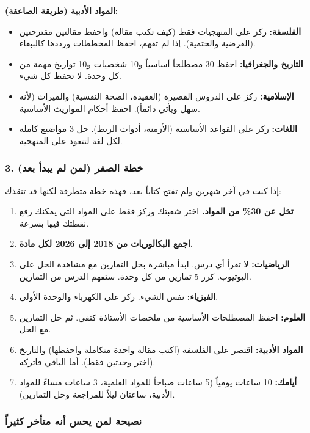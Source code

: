 \documentclass[12pt,a4paper]{book}
\begin{document}
	\textbf{المواد الأدبية (طريقة الصاعقة):}
	\begin{itemize}
		\item \textbf{الفلسفة:} ركز على المنهجيات فقط (كيف تكتب مقالة) واحفظ مقالتين مقترحتين (الفرضية والحتمية). إذا لم تفهم، احفظ المخططات ورددها كالببغاء.
		\item \textbf{التاريخ والجغرافيا:} احفظ 30 مصطلحاً أساسياً و10 شخصيات و10 تواريخ مهمة من كل وحدة. لا تحفظ كل شيء.
		\item \textbf{الإسلامية:} ركز على الدروس القصيرة (العقيدة، الصحة النفسية) والميراث (لأنه سهل ويأتي دائماً). احفظ أحكام المواريث الأساسية.
		\item \textbf{اللغات:} ركز على القواعد الأساسية (الأزمنة، أدوات الربط). حل 3 مواضيع كاملة لكل لغة لتتعود على المنهجية.
	\end{itemize}
	
	\subsubsection*{3. خطة الصفر (لمن لم يبدأ بعد)}
	إذا كنت في آخر شهرين ولم تفتح كتاباً بعد، فهذه خطة متطرفة لكنها قد تنقذك:
	
	\begin{enumerate}
		\item \textbf{تخل عن 30\% من المواد.} اختر شعبتك وركز فقط على المواد التي يمكنك رفع نقطتك فيها بسرعة.
		\item \textbf{اجمع البكالوريات من 2018 إلى 2026 لكل مادة.}
		\item \textbf{الرياضيات:} لا تقرأ أي درس. ابدأ مباشرة بحل التمارين مع مشاهدة الحل على اليوتيوب. كرر 5 تمارين من كل وحدة. ستفهم الدرس من التمارين.
		\item \textbf{الفيزياء:} نفس الشيء. ركز على الكهرباء والوحدة الأولى.
		\item \textbf{العلوم:} احفظ المصطلحات الأساسية من ملخصات الأستاذة كتفي. ثم حل التمارين مع الحل.
		\item \textbf{المواد الأدبية:} اقتصر على الفلسفة (اكتب مقالة واحدة متكاملة واحفظها) والتاريخ (اختر وحدتين فقط). أما الباقي فاتركه.
		\item \textbf{أيامك:} 10 ساعات يومياً (5 ساعات صباحاً للمواد العلمية، 3 ساعات مساءً للمواد الأدبية، ساعتان ليلاً للمراجعة وحل التمارين).
	\end{enumerate}
	

	
	\subsubsection*{نصيحة لمن يحس أنه متأخر كثيراً}
	
\end{document}
